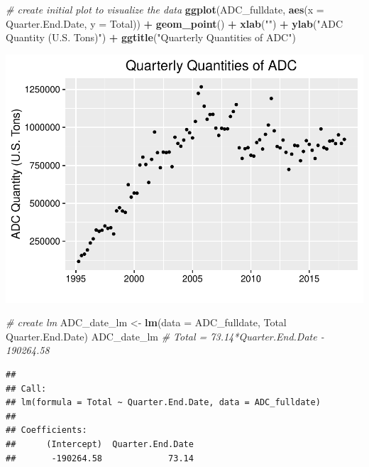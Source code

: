 \documentclass[12pt,]{article}
\newenvironment{Shaded}{\begin{snugshade}}{\end{snugshade}}
\newcommand{\KeywordTok}[1]{\textcolor[rgb]{0.13,0.29,0.53}{\textbf{#1}}}
\newcommand{\DataTypeTok}[1]{\textcolor[rgb]{0.13,0.29,0.53}{#1}}
\newcommand{\StringTok}[1]{\textcolor[rgb]{0.31,0.60,0.02}{#1}}
\newcommand{\CommentTok}[1]{\textcolor[rgb]{0.56,0.35,0.01}{\textit{#1}}}
\newcommand{\OperatorTok}[1]{\textcolor[rgb]{0.81,0.36,0.00}{\textbf{#1}}}
\newcommand{\NormalTok}[1]{#1}
\begin{document}
\begin{Shaded}
\begin{Highlighting}[]
\CommentTok{# create initial plot to visualize the data}
\KeywordTok{ggplot}\NormalTok{(ADC_fulldate, }\KeywordTok{aes}\NormalTok{(}\DataTypeTok{x =}\NormalTok{ Quarter.End.Date, }\DataTypeTok{y =}\NormalTok{ Total)) }\OperatorTok{+}
\StringTok{  }\KeywordTok{geom_point}\NormalTok{() }\OperatorTok{+}\StringTok{ }
\StringTok{  }\KeywordTok{xlab}\NormalTok{(}\StringTok{""}\NormalTok{) }\OperatorTok{+}\StringTok{ }
\StringTok{  }\KeywordTok{ylab}\NormalTok{(}\StringTok{"ADC Quantity (U.S. Tons)"}\NormalTok{) }\OperatorTok{+}
\StringTok{  }\KeywordTok{ggtitle}\NormalTok{(}\StringTok{"Quarterly Quantities of ADC"}\NormalTok{)}
\end{Highlighting}
\end{Shaded}

\includegraphics{SKo_Project_Template_files/figure-latex/Test2-1.pdf}

\begin{Shaded}
\begin{Highlighting}[]
\CommentTok{# create lm}
\NormalTok{ADC_date_lm <-}\StringTok{ }\KeywordTok{lm}\NormalTok{(}\DataTypeTok{data =}\NormalTok{ ADC_fulldate, Total }\OperatorTok{~}\StringTok{ }\NormalTok{Quarter.End.Date)}
\NormalTok{ADC_date_lm }\CommentTok{# Total = 73.14*Quarter.End.Date - 190264.58}
\end{Highlighting}
\end{Shaded}

\begin{verbatim}
## 
## Call:
## lm(formula = Total ~ Quarter.End.Date, data = ADC_fulldate)
## 
## Coefficients:
##      (Intercept)  Quarter.End.Date  
##       -190264.58             73.14
\end{verbatim}
\end{document}
